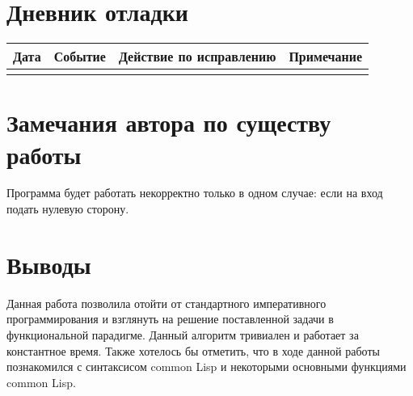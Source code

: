 \documentclass[12pt]{article}
\begin{document}
\section{Дневник отладки}
\begin{tabular}{|p{50pt}|p{130pt}|p{130pt}|p{70pt}|}
\hline
Дата & Событие & Действие по исправлению & Примечание \\ \hline
 &  &  &\\
\hline
\end{tabular}

\section{Замечания автора по существу работы}
Программа будет работать некорректно только в одном случае: если на вход подать нулевую сторону.

\section{Выводы}
Данная работа позволила отойти от стандартного императивного программирования и взглянуть на решение поставленной задачи  в функциональной парадигме. Данный алгоритм тривиален и работает за константное время. Также хотелось бы отметить, что в ходе данной работы познакомился с синтаксисом common Lisp и некоторыми основными функциями common Lisp.
\end{document}
